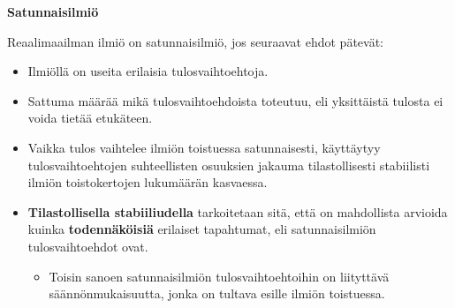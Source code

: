 \documentclass[
]{book}
\providecommand{\tightlist}{%
  \setlength{\itemsep}{0pt}\setlength{\parskip}{0pt}}
\begin{document}
\begin{defblock}{}

\textbf{Satunnaisilmiö}

Reaalimaailman ilmiö on satunnaisilmiö, jos seuraavat ehdot pätevät:

\begin{itemize}
\tightlist
\item
  Ilmiöllä on useita erilaisia tulosvaihtoehtoja.
\item
  Sattuma määrää mikä tulosvaihtoehdoista toteutuu, eli yksittäistä tulosta ei voida tietää etukäteen.
\item
  Vaikka tulos vaihtelee ilmiön toistuessa satunnaisesti, käyttäytyy tulosvaihtoehtojen suhteellisten osuuksien jakauma tilastollisesti stabiilisti ilmiön toistokertojen lukumäärän kasvaessa.
\end{itemize}

\end{defblock}

\begin{itemize}
\tightlist
\item
  \textbf{Tilastollisella stabiiliudella} tarkoitetaan sitä, että on mahdollista arvioida kuinka \textbf{todennäköisiä} erilaiset tapahtumat, eli satunnaisilmiön tulosvaihtoehdot ovat.

  \begin{itemize}
  \tightlist
  \item
    Toisin sanoen satunnaisilmiön tulosvaihtoehtoihin on liityttävä säännönmukaisuutta, jonka on tultava esille ilmiön toistuessa.
  \end{itemize}
\end{itemize}
\end{document}
